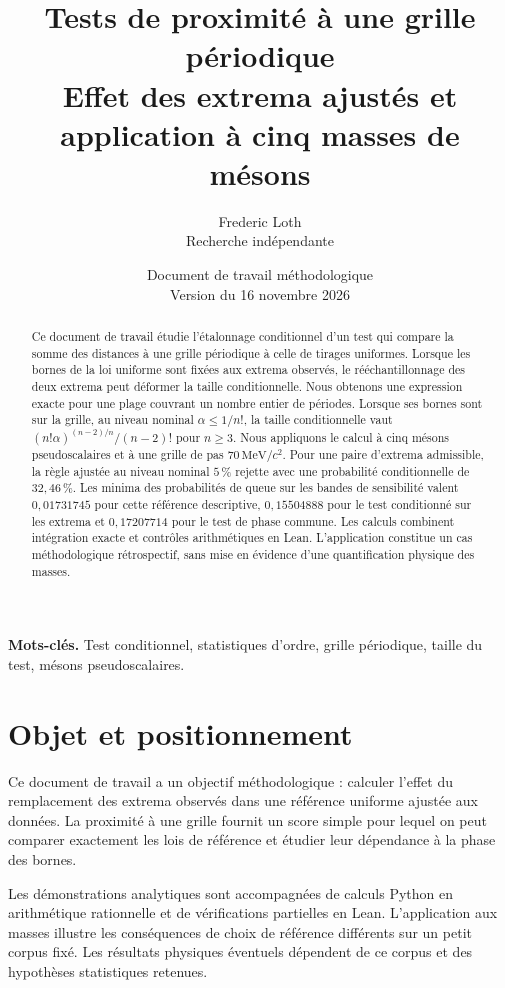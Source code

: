 \documentclass[11pt,a4paper]{article}
\title{Tests de proximité à une grille périodique\\[2pt]
\large Effet des extrema ajustés et application à cinq masses de mésons}
\author{Frederic Loth\\[4pt]
\small Recherche indépendante}
\date{Document de travail méthodologique\\Version du 16 novembre 2026}
\newcommand{\unit}{\,\mathrm{MeV}/c^{2}}
\begin{document}
\maketitle
\begin{abstract}
Ce document de travail étudie l'étalonnage conditionnel d'un test qui compare la somme des distances à une grille périodique à celle de tirages uniformes. Lorsque les bornes de la loi uniforme sont fixées aux extrema observés, le rééchantillonnage des deux extrema peut déformer la taille conditionnelle. Nous obtenons une expression exacte pour une plage couvrant un nombre entier de périodes. Lorsque ses bornes sont sur la grille, au niveau nominal $\alpha\leq 1/n!$, la taille conditionnelle vaut $(n!\alpha)^{(n-2)/n}/(n-2)!$ pour $n\geq 3$. Nous appliquons le calcul à cinq mésons pseudoscalaires et à une grille de pas $70\unit$. Pour une paire d'extrema admissible, la règle ajustée au niveau nominal $5\,\%$ rejette avec une probabilité conditionnelle de $32{,}46\,\%$. Les minima des probabilités de queue sur les bandes de sensibilité valent $0{,}01731745$ pour cette référence descriptive, $0{,}15504888$ pour le test conditionné sur les extrema et $0{,}17207714$ pour le test de phase commune. Les calculs combinent intégration exacte et contrôles arithmétiques en Lean. L'application constitue un cas méthodologique rétrospectif, sans mise en évidence d'une quantification physique des masses.
\end{abstract}
\noindent\textbf{Mots-clés.} Test conditionnel, statistiques d'ordre, grille périodique, taille du test, mésons pseudoscalaires.

\section{Objet et positionnement}

Ce document de travail a un objectif méthodologique : calculer l'effet du remplacement des extrema observés dans une référence uniforme ajustée aux données. La proximité à une grille fournit un score simple pour lequel on peut comparer exactement les lois de référence et étudier leur dépendance à la phase des bornes.

Les démonstrations analytiques sont accompagnées de calculs Python en arithmétique rationnelle et de vérifications partielles en Lean. L'application aux masses illustre les conséquences de choix de référence différents sur un petit corpus fixé. Les résultats physiques éventuels dépendent de ce corpus et des hypothèses statistiques retenues.
\end{document}
